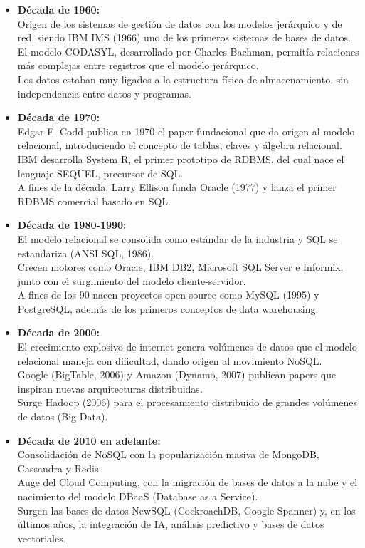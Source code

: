 \documentclass[12pt,a4paper]{article}
\begin{document}
\begin{itemize}
\item \textbf{Década de 1960:} \\
  Origen de los sistemas de gestión de datos con los modelos jerárquico y de red, siendo IBM IMS (1966) uno de los primeros sistemas de bases de datos. \\
  El modelo CODASYL, desarrollado por Charles Bachman, permitía relaciones más complejas entre registros que el modelo jerárquico. \\
  Los datos estaban muy ligados a la estructura física de almacenamiento, sin independencia entre datos y programas.

\item \textbf{Década de 1970:} \\
  Edgar F. Codd publica en 1970 el paper fundacional que da origen al modelo relacional, introduciendo el concepto de tablas, claves y álgebra relacional. \\
  IBM desarrolla System R, el primer prototipo de RDBMS, del cual nace el lenguaje SEQUEL, precursor de SQL. \\
  A fines de la década, Larry Ellison funda Oracle (1977) y lanza el primer RDBMS comercial basado en SQL.

\item \textbf{Década de 1980-1990:} \\
  El modelo relacional se consolida como estándar de la industria y SQL se estandariza (ANSI SQL, 1986). \\
  Crecen motores como Oracle, IBM DB2, Microsoft SQL Server e Informix, junto con el surgimiento del modelo cliente-servidor. \\
  A fines de los 90 nacen proyectos open source como MySQL (1995) y PostgreSQL, además de los primeros conceptos de data warehousing.

\item \textbf{Década de 2000:} \\
  El crecimiento explosivo de internet genera volúmenes de datos que el modelo relacional maneja con dificultad, dando origen al movimiento NoSQL. \\
  Google (BigTable, 2006) y Amazon (Dynamo, 2007) publican papers que inspiran nuevas arquitecturas distribuidas. \\
  Surge Hadoop (2006) para el procesamiento distribuido de grandes volúmenes de datos (Big Data).

\item \textbf{Década de 2010 en adelante:} \\
  Consolidación de NoSQL con la popularización masiva de MongoDB, Cassandra y Redis. \\
  Auge del Cloud Computing, con la migración de bases de datos a la nube y el nacimiento del modelo DBaaS (Database as a Service). \\
  Surgen las bases de datos NewSQL (CockroachDB, Google Spanner) y, en los últimos años, la integración de IA, análisis predictivo y bases de datos vectoriales.
\end{itemize}
\end{document}
